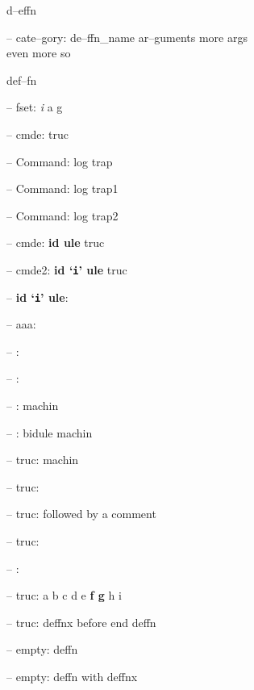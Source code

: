 \documentclass{book}
\begin{document}
%
d--effn

\hbox{}-- cate--gory: de--ffn\_name ar--guments    more args \leavevmode{}\\ even more so


%
def--fn

\hbox{}-- fset: \emph{i} a g


%
%
\hbox{}-- cmde: truc 


%
\hbox{}-- Command: log trap 


%
\hbox{}-- Command: log trap1 


%
\hbox{}-- Command: log trap2 


%
\hbox{}-- cmde: \textbf{id ule} truc


%
\hbox{}-- cmde2: \textbf{id `\texttt{i}' ule} truc


%
\hbox{}-- \textbf{id `\texttt{i}' ule}: 



\hbox{}-- aaa: 


\hbox{}-- : 


\hbox{}-- : 


\hbox{}-- : machin


%
\hbox{}-- : bidule machin


%
\hbox{}-- truc: machin


%
\hbox{}-- truc: 


\hbox{}-- truc: followed by a comment


%
\hbox{}-- truc: 


\hbox{}-- : 


\hbox{}-- truc: a b c d e \textbf{f g} h i


%
\hbox{}-- truc: deffnx before end deffn


%

\hbox{}-- empty: deffn


%

\hbox{}-- empty: deffn with deffnx
\end{document}
